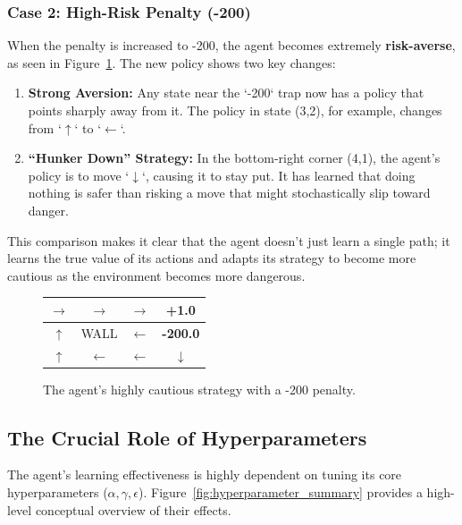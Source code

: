 \documentclass[11pt, a4paper]{article}
\begin{document}
\subsubsection{Case 2: High-Risk Penalty (-200)}
When the penalty is increased to -200, the agent becomes extremely \textbf{risk-averse}, as seen in Figure~\ref{fig:policy_high_risk}. The new policy shows two key changes:
\begin{enumerate}
    \item \textbf{Strong Aversion:} Any state near the `-200` trap now has a policy that points sharply away from it. The policy in state (3,2), for example, changes from `$\uparrow$` to `$\leftarrow$`.
    
    \item \textbf{``Hunker Down'' Strategy:} In the bottom-right corner (4,1), the agent's policy is to move `$\downarrow$`, causing it to stay put. It has learned that doing nothing is safer than risking a move that might stochastically slip toward danger.
\end{enumerate}

This comparison makes it clear that the agent doesn't just learn a single path; it learns the true value of its actions and adapts its strategy to become more cautious as the environment becomes more dangerous.

\begin{figure}[H]
    \centering
    \begin{tabular}{|c|c|c|c|}
        \hline
        $\rightarrow$ & $\rightarrow$ & $\rightarrow$ & \textbf{+1.0} \\
        \hline
        $\uparrow$ & WALL & $\leftarrow$ & \textbf{-200.0} \\
        \hline
        $\uparrow$ & $\leftarrow$ & $\leftarrow$ & $\downarrow$ \\
        \hline
    \end{tabular}
    \caption{The agent's highly cautious strategy with a -200 penalty.}\label{fig:policy_high_risk}
\end{figure}
\subsection{The Crucial Role of Hyperparameters}
The agent's learning effectiveness is highly dependent on tuning its core hyperparameters ($\alpha, \gamma, \epsilon$). Figure~\ref{fig:hyperparameter_summary} provides a high-level conceptual overview of their effects.
\end{document}
